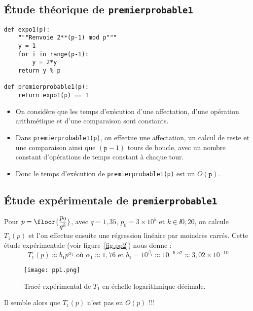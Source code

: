 \subsection{Étude théorique de \texttt{premierprobable1}}


\begin{lstlisting}
def expo1(p):
    """Renvoie 2**(p-1) mod p"""
    y = 1
    for i in range(p-1):
        y = 2*y
    return y % p

def premierprobable1(p):
    return expo1(p) == 1
\end{lstlisting}

\begin{itemize}
\item[\textbullet] On considère que les temps d'exécution d'une affectation, d'une
  opération arithmétique et d'une comparaison sont constants.
\item[\textbullet] Dans \texttt{premierprobable1(p)}, on effectue une affectation, un
  calcul de reste et
  une comparaison ainsi que $(\texttt{p}-1)$ tours de boucle, avec un
  nombre constant d'opérations de temps constant à chaque tour.
\item[\textbullet] Donc le temps d'exécution de \texttt{premierprobable1(p)} est un
  $O(\texttt{p})$.
\end{itemize}

\subsection{Étude expérimentale de \texttt{premierprobable1}}
Pour $p = \floor{\dfrac{p_0}{q^k}}$, avec $q = 1,35$, $p_0 = 3\times 10^5$ et $k\in\ii{0,20}$, on calcule $T_1(p)$ et l'on effectue ensuite une régression linéaire par moindres carrés. Cette étude expérimentale (voir figure~\ref{fig.pp2}) nous donne :
\begin{equation*}
  T_{1}(p)\approx b_{1} p^{\alpha_{1}}
  \text{ où }\alpha_{1}\approx 1,76
  \text{ et }b_{1} = 10^{\beta_{1}} \approx 10^{-9,52}
  \approx 3,02 \times 10^{-10}
\end{equation*}
\begin{figure}[!h]
  \begin{center}
    \texttt{[image: pp1.png]}
    \caption{Tracé expérimental de $T_1$ en échelle logarithmique décimale.}
    \label{fig.pp1}
  \end{center}
\end{figure}


Il semble alors que $T_1(p)$ n'est pas en $O(p)$ !!!

